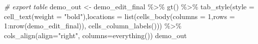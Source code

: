 \documentclass[
]{article}
\newenvironment{Shaded}{\begin{snugshade}}{\end{snugshade}}
\newcommand{\AttributeTok}[1]{\textcolor[rgb]{0.77,0.63,0.00}{#1}}
\newcommand{\CommentTok}[1]{\textcolor[rgb]{0.56,0.35,0.01}{\textit{#1}}}
\newcommand{\DecValTok}[1]{\textcolor[rgb]{0.00,0.00,0.81}{#1}}
\newcommand{\FunctionTok}[1]{\textcolor[rgb]{0.00,0.00,0.00}{#1}}
\newcommand{\NormalTok}[1]{#1}
\newcommand{\OtherTok}[1]{\textcolor[rgb]{0.56,0.35,0.01}{#1}}
\newcommand{\SpecialCharTok}[1]{\textcolor[rgb]{0.00,0.00,0.00}{#1}}
\newcommand{\StringTok}[1]{\textcolor[rgb]{0.31,0.60,0.02}{#1}}
\begin{document}
\begin{Shaded}
\begin{Highlighting}[]
\CommentTok{\# export table}
\NormalTok{demo\_out }\OtherTok{\textless{}{-}}\NormalTok{ demo\_edit\_final }\SpecialCharTok{\%\textgreater{}\%} \FunctionTok{gt}\NormalTok{() }\SpecialCharTok{\%\textgreater{}\%} 
  \FunctionTok{tab\_style}\NormalTok{(}\AttributeTok{style =} \FunctionTok{cell\_text}\NormalTok{(}\AttributeTok{weight =} \StringTok{"bold"}\NormalTok{),}\AttributeTok{locations =} \FunctionTok{list}\NormalTok{(}\FunctionTok{cells\_body}\NormalTok{(}\AttributeTok{columns =} \DecValTok{1}\NormalTok{,}\AttributeTok{rows =} \DecValTok{1}\SpecialCharTok{:}\FunctionTok{nrow}\NormalTok{(demo\_edit\_final)), }\FunctionTok{cells\_column\_labels}\NormalTok{())) }\SpecialCharTok{\%\textgreater{}\%}
  \FunctionTok{cols\_align}\NormalTok{(}\AttributeTok{align=}\StringTok{"right"}\NormalTok{, }\AttributeTok{columns=}\FunctionTok{everything}\NormalTok{())}
\NormalTok{demo\_out}
\end{Highlighting}
\end{Shaded}
\end{document}
